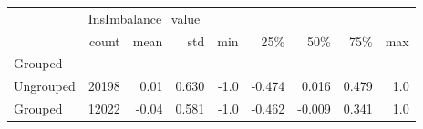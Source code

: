 \begin{tabular}{lrrrrrrrr}
\toprule
{} & \multicolumn{8}{l}{InsImbalance\_value} \\
{} &              count &  mean &    std &  min &    25\% &    50\% &    75\% &  max \\
Grouped   &                    &       &        &      &        &        &        &      \\
\midrule
Ungrouped &              20198 &  0.01 &  0.630 & -1.0 & -0.474 &  0.016 &  0.479 &  1.0 \\
Grouped   &              12022 & -0.04 &  0.581 & -1.0 & -0.462 & -0.009 &  0.341 &  1.0 \\
\bottomrule
\end{tabular}

